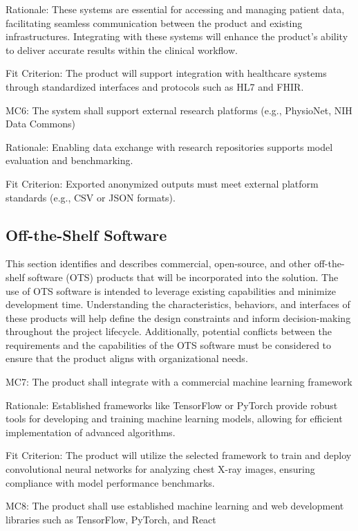 \documentclass[12pt]{article}
\begin{document}
Rationale: These systems are essential for accessing and managing patient data, facilitating seamless communication between the product and existing infrastructures. Integrating with these systems will enhance the product's ability to deliver accurate results within the clinical workflow.

Fit Criterion: The product will support integration with healthcare systems through standardized interfaces and protocols such as HL7 and FHIR\cite{fhir}.

\indent
MC6: The system shall support external research platforms (e.g., PhysioNet, NIH Data Commons)

Rationale: Enabling data exchange with research repositories supports model evaluation and benchmarking.

Fit Criterion: Exported anonymized outputs must meet external platform standards (e.g., CSV or JSON formats).

\subsection{Off-the-Shelf Software}
This section identifies and describes commercial, open-source, and other off-the-shelf software (OTS) products that will be incorporated into the solution. The use of OTS software is intended to leverage existing capabilities and minimize development time. Understanding the characteristics, behaviors, and interfaces of these products will help define the design constraints and inform decision-making throughout the project lifecycle. Additionally, potential conflicts between the requirements and the capabilities of the OTS software must be considered to ensure that the product aligns with organizational needs.

\indent
MC7: The product shall integrate with a commercial machine learning framework

Rationale: Established frameworks like TensorFlow or PyTorch provide robust tools for developing and training machine learning models, allowing for efficient implementation of advanced algorithms.

Fit Criterion: The product will utilize the selected framework to train and deploy convolutional neural networks for analyzing chest X-ray images, ensuring compliance with model performance benchmarks.

\indent
MC8: The product shall use established machine learning and web development libraries such as TensorFlow, PyTorch, and React
\end{document}
